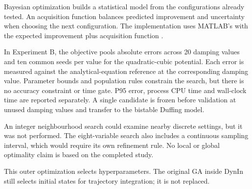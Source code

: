 \begin{bluerevision}
Bayesian optimization builds a statistical model from the configurations already tested. An acquisition function balances predicted improvement and uncertainty when choosing the next configuration. The implementation uses MATLAB's  with the expected improvement plus acquisition function \cite{ref16,ref17}.

In Experiment B, the objective pools absolute errors across 20 damping values and ten common seeds per value for the quadratic-cubic potential. Each error is measured against the analytical-equation reference at the corresponding damping value. Parameter bounds and population rules constrain the search, but there is no accuracy constraint or time gate. P95 error, process CPU time and wall-clock time are reported separately. A single candidate is frozen before validation at unused damping values and transfer to the bistable Duffing model.

An integer neighbourhood search could examine nearby discrete settings, but it was not performed. The eight-variable search also includes a continuous sampling interval, which would require its own refinement rule. No local or global optimality claim is based on the completed study.
\end{bluerevision}

This outer optimization selects hyperparameters. The original GA inside DynIn still selects initial states for trajectory integration; it is not replaced.
